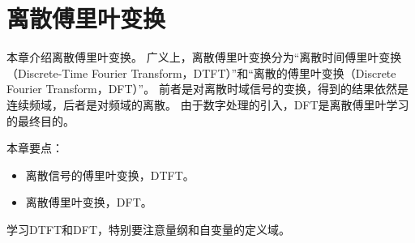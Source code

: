 \chapter{离散傅里叶变换}

本章介绍离散傅里叶变换。
广义上，离散傅里叶变换分为“离散时间傅里叶变换（Discrete-Time Fourier Transform，DTFT）”和“离散的傅里叶变换（Discrete Fourier Transform，DFT）”。
前者是对离散时域信号的变换，得到的结果依然是连续频域，后者是对频域的离散。
由于数字处理的引入，DFT是离散傅里叶学习的最终目的。

本章要点：
\begin{itemize}
    \item 离散信号的傅里叶变换，DTFT。
    \item 离散傅里叶变换，DFT。
\end{itemize}

\begin{tcolorbox}
学习DTFT和DFT，特别要注意量纲和自变量的定义域。
\end{tcolorbox}

\newpage


\newpage


\newpage


\newpage


\newpage


\newpage





